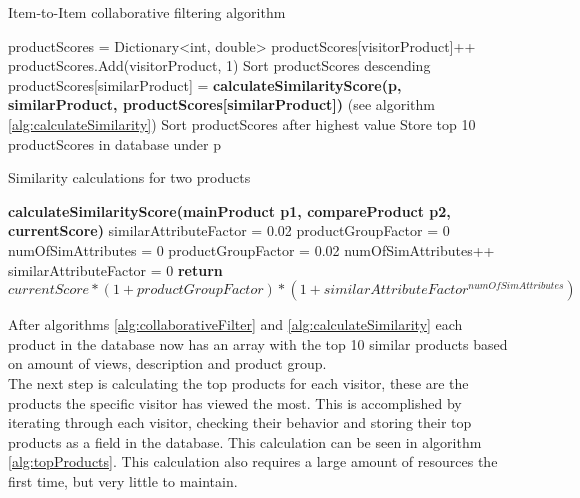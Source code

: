 \begin{algorithm}[H]
\caption{Item-to-Item collaborative filtering algorithm}
\label{alg:collaborativeFilter}
\begin{algorithmic}[1]
\State productScores = Dictionary<int, double>
\State productScores[visitorProduct]++
\Else
\State productScores.Add(visitorProduct, 1)
\EndIf
\EndFor
\EndFor
\State Sort productScores descending
\State productScores[similarProduct] =
\State \textbf{calculateSimilarityScore(p, similarProduct, productScores[similarProduct])} (see algorithm \ref{alg:calculateSimilarity})
\EndFor
\State Sort productScores after highest value
\State Store top 10 productScores in database under p
\EndFor
\end{algorithmic}
\end{algorithm}

\begin{algorithm}[H]
\caption{Similarity calculations for two products }
\label{alg:calculateSimilarity}
\begin{algorithmic}[1]

\State \textbf{calculateSimilarityScore(mainProduct p1, compareProduct p2, currentScore)}
\State similarAttributeFactor = 0.02
\State productGroupFactor = 0
\State numOfSimAttributes = 0
\State productGroupFactor = 0.02
\EndIf
{}
\State numOfSimAttributes++
\EndIf
\EndFor
{}
\State similarAttributeFactor = 0
\EndIf
\State \textbf{return} \begin{math} currentScore * (1+productGroupFactor)*(1+similarAttributeFactor^{numOfSimAttributes}) \end{math}
\end{algorithmic}
\end{algorithm}


After algorithms \ref{alg:collaborativeFilter} and \ref{alg:calculateSimilarity} each product in the database now has an array with the top 10 similar products based on amount of views, description and product group. \\
The next step is calculating the top products for each visitor, these are the products the specific visitor has viewed the most. This is accomplished by iterating through each visitor, checking their behavior and storing their top products as a field in the database. This calculation can be seen in algorithm \ref{alg:topProducts}. This calculation also requires a large amount of resources the first time, but very little to maintain.


